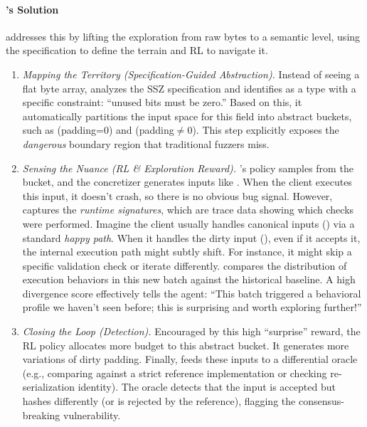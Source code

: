 \paragraph{\tool's Solution}
\tool addresses this by lifting the exploration from raw bytes to a semantic level, using the specification to define the terrain and RL to navigate it.
\begin{enumerate}
    \item \emph{Mapping the Territory (Specification-Guided Abstraction).} Instead of seeing a flat byte array, \tool analyzes the SSZ specification and identifies  as a type with a specific constraint: ``unused bits must be zero.'' Based on this, it automatically partitions the input space for this field into abstract buckets, such as  (padding=0) and  (padding$\neq$0). This step explicitly exposes the \emph{dangerous} boundary region that traditional fuzzers miss.

    \item \emph{Sensing the Nuance (RL \& Exploration Reward).} \tool's policy samples from the  bucket, and the concretizer generates inputs like . When the client executes this input, it doesn't crash, so there is no obvious bug signal. However, \tool captures the \emph{runtime signatures}, which are trace data showing which checks were performed. Imagine the client usually handles canonical inputs () via a standard \emph{happy path}. When it handles the dirty input (), even if it accepts it, the internal execution path might subtly shift. For instance, it might skip a specific validation check or iterate differently. \tool compares the distribution of execution behaviors in this new batch against the historical baseline. A high divergence score effectively tells the agent: ``This batch triggered a behavioral profile we haven't seen before; this is surprising and worth exploring further!''

    \item \emph{Closing the Loop (Detection).} Encouraged by this high ``surprise'' reward, the RL policy allocates more budget to this abstract bucket. It generates more variations of dirty padding. Finally, \tool feeds these inputs to a differential oracle (e.g., comparing against a strict reference implementation or checking re-serialization identity). The oracle detects that the input is accepted but hashes differently (or is rejected by the reference), flagging the consensus-breaking vulnerability.
\end{enumerate}

